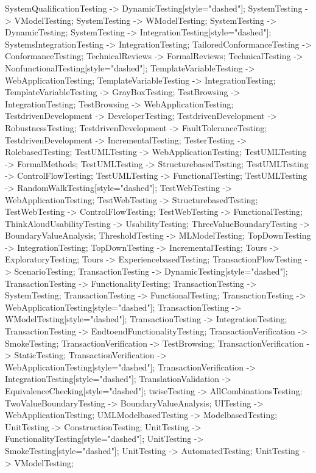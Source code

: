 \documentclass{article}
\begin{document}
{SystemQualificationTesting -> DynamicTesting[style="dashed"];
SystemTesting -> VModelTesting;
SystemTesting -> WModelTesting;
SystemTesting -> DynamicTesting;
SystemTesting -> IntegrationTesting[style="dashed"];
SystemsIntegrationTesting -> IntegrationTesting;
TailoredConformanceTesting -> ConformanceTesting;
TechnicalReviews -> FormalReviews;
TechnicalTesting -> NonfunctionalTesting[style="dashed"];
TemplateVariableTesting -> WebApplicationTesting;
TemplateVariableTesting -> IntegrationTesting;
TemplateVariableTesting -> GrayBoxTesting;
TestBrowsing -> IntegrationTesting;
TestBrowsing -> WebApplicationTesting;
TestdrivenDevelopment -> DeveloperTesting;
TestdrivenDevelopment -> RobustnessTesting;
TestdrivenDevelopment -> FaultToleranceTesting;
TestdrivenDevelopment -> IncrementalTesting;
TesterTesting -> RolebasedTesting;
TestUMLTesting -> WebApplicationTesting;
TestUMLTesting -> FormalMethods;
TestUMLTesting -> StructurebasedTesting;
TestUMLTesting -> ControlFlowTesting;
TestUMLTesting -> FunctionalTesting;
TestUMLTesting -> RandomWalkTesting[style="dashed"];
TestWebTesting -> WebApplicationTesting;
TestWebTesting -> StructurebasedTesting;
TestWebTesting -> ControlFlowTesting;
TestWebTesting -> FunctionalTesting;
ThinkAloudUsabilityTesting -> UsabilityTesting;
ThreeValueBoundaryTesting -> BoundaryValueAnalysis;
ThresholdTesting -> MLModelTesting;
TopDownTesting -> IntegrationTesting;
TopDownTesting -> IncrementalTesting;
Tours -> ExploratoryTesting;
Tours -> ExperiencebasedTesting;
TransactionFlowTesting -> ScenarioTesting;
TransactionTesting -> DynamicTesting[style="dashed"];
TransactionTesting -> FunctionalityTesting;
TransactionTesting -> SystemTesting;
TransactionTesting -> FunctionalTesting;
TransactionTesting -> WebApplicationTesting[style="dashed"];
TransactionTesting -> WModelTesting[style="dashed"];
TransactionTesting -> IntegrationTesting;
TransactionTesting -> EndtoendFunctionalityTesting;
TransactionVerification -> SmokeTesting;
TransactionVerification -> TestBrowsing;
TransactionVerification -> StaticTesting;
TransactionVerification -> WebApplicationTesting[style="dashed"];
TransactionVerification -> IntegrationTesting[style="dashed"];
TranslationValidation -> EquivalenceChecking[style="dashed"];
twiseTesting -> AllCombinationsTesting;
TwoValueBoundaryTesting -> BoundaryValueAnalysis;
UITesting -> WebApplicationTesting;
UMLModelbasedTesting -> ModelbasedTesting;
UnitTesting -> ConstructionTesting;
UnitTesting -> FunctionalityTesting[style="dashed"];
UnitTesting -> SmokeTesting[style="dashed"];
UnitTesting -> AutomatedTesting;
UnitTesting -> VModelTesting;
}
\end{document}
